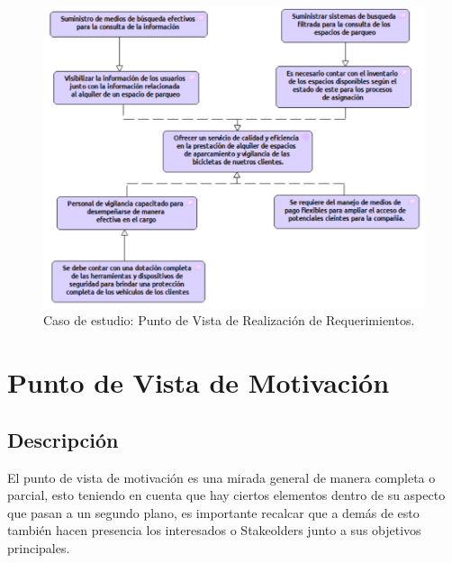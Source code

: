 \begin{figure}[h]
	\centering
	\includegraphics[width=1.0\textwidth]{imagenes/Caso_Estudio/Motivacion/Realizacion_Requerimientos.PDF}
	\caption{Caso de estudio: Punto de Vista de Realización de Requerimientos.}
	\label{fig:gap_analysis}
\end{figure}


\section{Punto de Vista de Motivación}
\subsection{Descripción}
El punto de vista de motivación es una mirada general de manera completa o parcial, esto teniendo en cuenta que hay ciertos elementos dentro de su aspecto que pasan a un segundo plano, es importante recalcar que a demás de esto también hacen presencia los interesados o Stakeolders junto a sus objetivos principales.
\\
\\
\\
\\
\\
\\
\\
